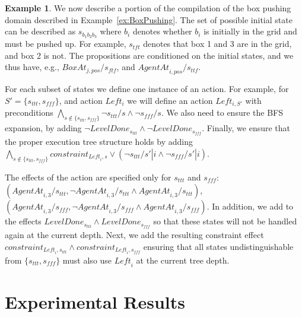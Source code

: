 \documentclass[letterpaper]{article}
\theoremstyle{definition}
\newtheorem{example}{Example}
\begin{document}
\begin{example}
We now describe a portion of the compilation of the box pushing domain described in Example~\ref{ex:BoxPushing}. The set of possible initial state can be described as $s_{b_1b_2 b_3}$ where $b_i$ denotes whether $b_i$ is initially in the grid and must be pushed up. For example, $s_{tft}$ denotes that box 1 and 3 are in the grid, and box 2 is not. The propositions are conditioned on the initial states, and we thus have, e.g., $\mathit{BoxAt}_{j,pos}/s_\mathit{ftf}$, and $\mathit{AgentAt}_{i,pos}/s_\mathit{ttf}$.

For each subset of states we define one instance of an action. For example, for $S'=\{s_\mathit{ttt},s_\mathit{fff}\}$, and action $\mathit{Left_i}$ we will define an action $\mathit{Left_{i,S'}}$ with preconditions $ \bigwedge_{s \notin \{s_\mathit{ttt},s_\mathit{fff}\}} \neg s_\mathit{ttt}/s \wedge \neg s_\mathit{fff}/s$. We also need to ensure the BFS expansion, by adding $\neg \mathit{LevelDone}_{s_\mathit{ttt}} \wedge \neg \mathit{LevelDone}_{s_\mathit{fff}}$. Finally, we ensure that the proper execution tree structure holds by adding $\bigwedge_{s \notin\{s_\mathit{ttt},s_\mathit{fff}\}} constraint_{\mathit{Left}_i,s} \vee ( \neg s_\mathit{ttt}/s'|i \wedge \neg s_\mathit{fff}/s'|i)$.

\noindent The effects of the action are specified only for $s_\mathit{ttt}$ and $s_\mathit{fff}$: \\
$(\mathit{AgentAt}_{i,3}/s_\mathit{ttt}, \neg \mathit{AgentAt}_{i,3}/s_\mathit{ttt} \wedge \mathit{AgentAt}_{i,3}/s_\mathit{ttt})$,
$(\mathit{AgentAt}_{i,3}/s_\mathit{fff}, \neg \mathit{AgentAt}_{i,3}/s_\mathit{fff} \wedge \mathit{AgentAt}_{i,3}/s_\mathit{fff})$.
In addition, we add to the effects $\mathit{LevelDone}_{s_\mathit{ttt}} \wedge \mathit{LevelDone}_{s_\mathit{fff}}$ so that these states will not be handled again at the current depth. Next, we add the resulting constraint effect $constraint_{\mathit{Left}_i,s_\mathit{ttt}} \wedge constraint_{\mathit{Left}_i,s_\mathit{fff}}$ ensuring that all states undistinguishable from $\{s_\mathit{ttt},s_\mathit{fff}\}$ must also use $\mathit{Left}_i$ at the current tree depth.

\end{example}



\section{Experimental Results}
\end{document}
